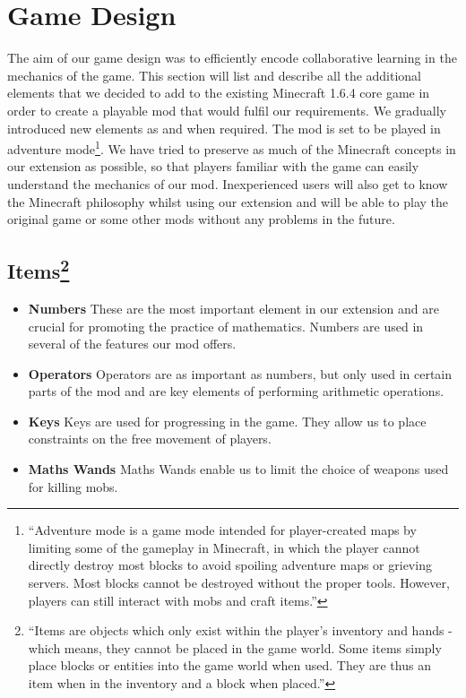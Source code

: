 \section{Game Design}
The aim of our game design was to efficiently encode collaborative learning in the mechanics of the game. This section will list and describe all the additional elements that we decided to add to the existing Minecraft 1.6.4 core game in order to create a playable mod that would fulfil our requirements. We gradually introduced new elements as and when required.
\newline\newline
The mod is set to be played in adventure mode\footnote{``Adventure mode is a game mode intended for player-created maps by limiting some of the gameplay in Minecraft, in which the player cannot directly destroy most blocks to avoid spoiling adventure maps or grieving servers. Most blocks cannot be destroyed without the proper tools. However, players can still interact with mobs and craft items.''\cite{website:minecraft-adventure}}.
We have tried to preserve as much of the Minecraft concepts in our extension as possible, so that players familiar with the game can easily understand the mechanics of our mod. Inexperienced users will also get to know the Minecraft philosophy whilst using our extension and will be able to play the original game or some other mods without any problems in the future.

\subsection[Items]{Items\footnote{``Items are objects which only exist within the player's inventory and hands - which means, they cannot be placed in the game world. Some items simply place blocks or entities into the game world when used. They are thus an item when in the inventory and a block when placed.''\cite{website:minecraft-item}}}

\begin{itemize}

\item \textbf{Numbers}
\newline
\normalsize These are the most important element in our extension and are crucial for promoting the practice of mathematics. Numbers are used in several of the features our mod offers.

\item \textbf{Operators}
\newline
\normalsize Operators are as important as numbers, but only used in certain parts of the mod and are key elements of performing arithmetic operations.

\item \textbf{Keys}
\newline
\normalsize Keys are used for progressing in the game. They allow us to place constraints on the free movement of players.

\item \textbf{Maths Wands}
\newline
\normalsize Maths Wands enable us to limit the choice of weapons used for killing mobs.

\end{itemize}

